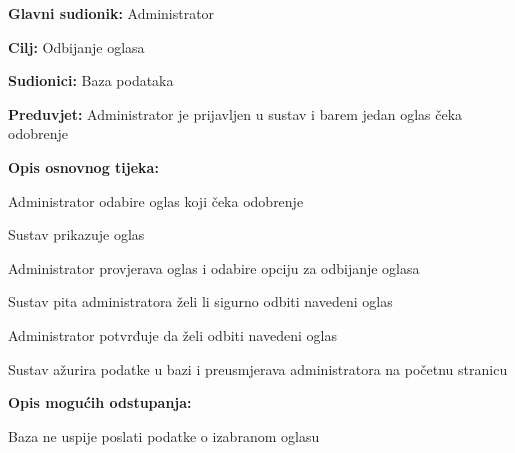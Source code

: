 					\noindent {}
					\begin{packed_item}
	
						\item \textbf{Glavni sudionik: }Administrator
						\item  \textbf{Cilj:} Odbijanje oglasa
						\item  \textbf{Sudionici:} Baza podataka
						\item  \textbf{Preduvjet:} Administrator je prijavljen u sustav i barem jedan oglas čeka odobrenje
						\item  \textbf{Opis osnovnog tijeka:}
						
						\item[] \begin{packed_enum}
							\item Administrator odabire oglas koji čeka odobrenje
							\item Sustav prikazuje oglas
							\item Administrator provjerava oglas i odabire opciju za odbijanje oglasa
							\item Sustav pita administratora želi li sigurno odbiti navedeni oglas
							\item Administrator potvrđuje da želi odbiti navedeni oglas
							\item Sustav ažurira podatke u bazi i preusmjerava administratora na početnu stranicu
						\end{packed_enum}

						\item  \textbf{Opis mogućih odstupanja:}

						\item[] \begin{packed_item}
							\item[2.a] Baza ne uspije poslati podatke o izabranom oglasu
							\item[] \begin{packed_enum}
								

\end{packed_enum}
\end{packed_item}
\end{packed_item}
